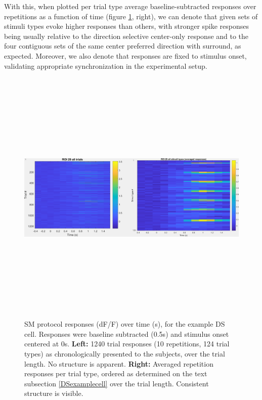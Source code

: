 With this, when plotted per trial type average baseline-subtracted responses over repetitions as a function of time (figure \ref{individualDStrials}, right), we can denote that given sets of stimuli types evoke higher responses than others, with stronger spike responses being usually relative to the direction selective center-only response and to the four contiguous sets of the same center preferred direction with surround, as expected. Moreover, we also denote that responses are fixed to stimulus onset, validating appropriate synchronization in the experimental setup.

\begin{figure}[H] \centering \includegraphics[width=12.5cm,height=12.5cm,keepaspectratio]{Figures/7.Results/individualSM/roi_29_mf379_pos5/roi29.png} 
\caption{SM protocol responses (dF/F) over time (s), for the example DS cell. Responses were baseline subtracted (0.5s) and stimulus onset centered at 0s.
\newline \textbf{Left:} 1240 trial responses (10 repetitions, 124 trial types) as chronologically presented to the subjects, over the trial length. No structure is apparent.
\newline \textbf{Right:} Averaged repetition responses per trial type, ordered as determined on the text subsection \ref{DSexamplecell} over the trial length. Consistent structure is visible.}
\label{individualDStrials}
\end{figure}


